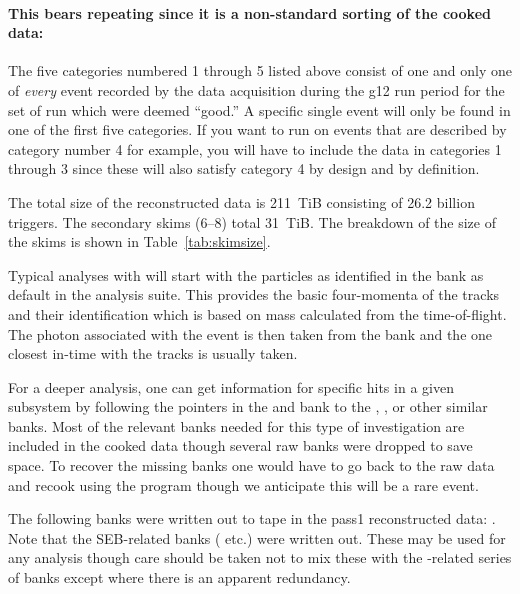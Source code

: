 \paragraph{This bears repeating since it is a non-standard sorting of the cooked data:} The five categories numbered 1 through 5 listed above consist of one and only one of \emph{every} event recorded by the data acquisition during the g12 run period for the set of run which were deemed ``good.'' A specific single event will only be found in one of the first five categories. If you want to run on events that are described by category number 4 for example, you will have to include the data in categories 1 through 3 since these will also satisfy category 4 by design and by definition.

\begin{v2}
The total size of the reconstructed data is 211~TiB consisting of 26.2 billion triggers. The secondary skims (6--8) total 31~TiB. The breakdown of the size of the skims is shown in Table~\ref{tab:skimsize}.

\end{v2}

Typical analyses with  will start with the particles as identified in the  bank as default in the  analysis suite. This provides the basic four-momenta of the tracks and their identification which is based on mass calculated from the time-of-flight. The photon associated with the event is then taken from the  bank and the one closest in-time with the tracks is usually taken.

For a deeper analysis, one can get information for specific hits in a given subsystem by following the pointers in the  and  bank to the , ,  or other similar banks. Most of the relevant banks needed for this type of investigation are included in the cooked data though several raw banks were dropped to save space. To recover the missing banks one would have to go back to the raw data and recook using the  program though we anticipate this will be a rare event.

\begin{v2}
The following banks were written out to tape in the pass1 reconstructed data: . Note that the SEB-related banks ( etc.) were written out. These may be used for any analysis though care should be taken not to mix these with the -related series of banks except where there is an apparent redundancy.
\end{v2}






